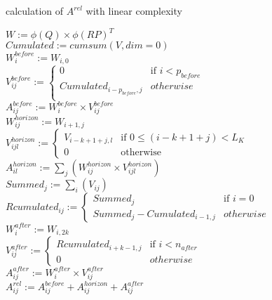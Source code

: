 \begin{algorithm*}[ht]
	\caption{calculation of $A^{rel}$ with linear complexity}
	\label{alg:A_rel}
	\vskip12pt
	\vskip12pt
	\vskip12pt
	$W := \phi(Q) \times \phi(RP)^T$\\
	\vskip3pt
	$Cumulated := cumsum(V, dim=0)$\\
	\vskip3pt
	$W^{before}_{i} := W_{i,0}$\\
	\vskip3pt
	$V^{before}_{ij} := 
	\begin{cases}
		0 & \text{if }i < p_{before}\\
		Cumulated_{i-p_{before}, j} & otherwise\\
	\end{cases}$\\
	\vskip3pt
	$A^{before}_{ij} := W^{before}_{i} \times V^{before}_{ij}$\\
	\vskip3pt
	$W^{horizon}_{ij} := W_{i+1,j}$\\
	\vskip3pt
	$V^{horizon}_{ijl} :=
	\begin{cases}
		V_{i-k+1+j, l} & \text{if }0 \leq (i-k+1+j) < L_K\\
		0 & \text{otherwise} 
	\end{cases}$\\
	\vskip3pt
	$A^{horizon}_{il} := \sum_j \left( W^{horizon}_{ij} \times V^{horizon}_{ijl} \right)$\\
	\vskip3pt
	$Summed_{j} := \sum_i \left( V_{ij}\right)$\\
	\vskip3pt
	$Rcumulated_{ij} := 
	\begin{cases}
		Summed_{j} & \text{if }i=0\\
		Summed_{j} - Cumulated_{i-1,j} & otherwise
	\end{cases}$\\
	\vskip3pt
	$W^{after}_{i} := W_{i, 2k}$\\
	\vskip3pt
	$V^{after}_{ij} := 
	\begin{cases}
		Rcumulated_{i+k-1,j} & \text{if }i<n_{after}\\
		0 & otherwise
	\end{cases}$\\
	\vskip3pt
	$A^{after}_{ij} := W^{after}_{i} \times V^{after}_{ij}$\\
	\vskip3pt
	$A^{rel}_{ij} := A^{before}_{ij} + A^{horizon}_{ij} + A^{after}_{ij}$
\end{algorithm*}

\endinput